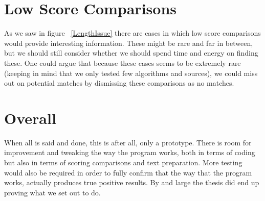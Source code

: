 \section{Low Score Comparisons}
As we saw in figure ~\ref{LengthIssue} there are cases in which low score comparisons would provide interesting information. These might be rare and far in between, but we should still consider whether we should spend time and energy on finding these. One could argue that because these cases seems to be extremely rare (keeping in mind that we only tested few algorithms and sources), we could miss out on potential matches by dismissing these comparisons as no matches.


\section{Overall}
When all is said and done, this is after all, only a prototype. There is room for improvement and tweaking the way the program works, both in terms of coding but also in terms of scoring comparisons and text preparation. More testing would also be required in order to fully confirm that the way that the program works, actually produces true positive results. By and large the thesis did end up proving what we set out to do.